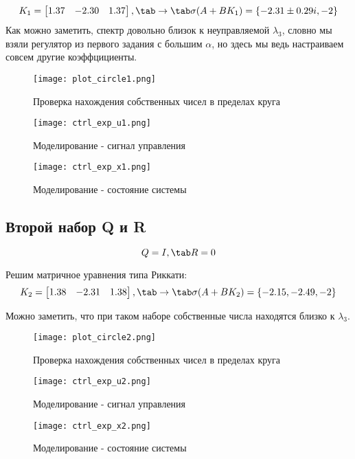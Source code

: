$$
K_1 = \begin{bmatrix}
  1.37 & -2.30  &   1.37
\end{bmatrix}, \tab\rightarrow\tab \sigma(A+BK_1)=\{ -2.31 \pm 0.29i, -2 \}
$$
Как можно заметить, спектр довольно близок к неуправляемой $\lambda_3$, словно мы взяли регулятор из первого задания с большим $\alpha$, но здесь мы ведь настраиваем совсем другие коэффцициенты.
\begin{figure}[ht]
  \centering
  \texttt{[image: plot\_circle1.png]}
  \caption{Проверка нахождения собственных чисел в пределах круга}
\end{figure}
\newpage
\begin{figure}[ht]
  \centering
  \texttt{[image: ctrl\_exp\_u1.png]}
  \caption{Моделирование - сигнал управления}
\end{figure}
\begin{figure}[ht]
  \centering
  \texttt{[image: ctrl\_exp\_x1.png]}
  \caption{Моделирование - состояние системы}
\end{figure}
  

\newpage
\subsection{Второй набор Q и R}
$$Q=I, \tab R = 0$$

Решим  матричное уравнения типа Риккати:
$$
K_2 = \begin{bmatrix}
    1.38 & -2.31 & 1.38
\end{bmatrix}, \tab\rightarrow\tab \sigma(A+BK_2)=\{  -2.15 , -2.49,  -2 \}
$$

Можно заметить, что при таком наборе собственные числа находятся близко к $\lambda_3$.

\begin{figure}[ht]
  \centering
  \texttt{[image: plot\_circle2.png]}
  \caption{Проверка нахождения собственных чисел в пределах круга}
\end{figure}
\newpage
\begin{figure}[ht]
  \centering
  \texttt{[image: ctrl\_exp\_u2.png]}
  \caption{Моделирование - сигнал управления}
\end{figure}
\begin{figure}[ht]
  \centering
  \texttt{[image: ctrl\_exp\_x2.png]}
  \caption{Моделирование - состояние системы}
\end{figure}

\newpage
